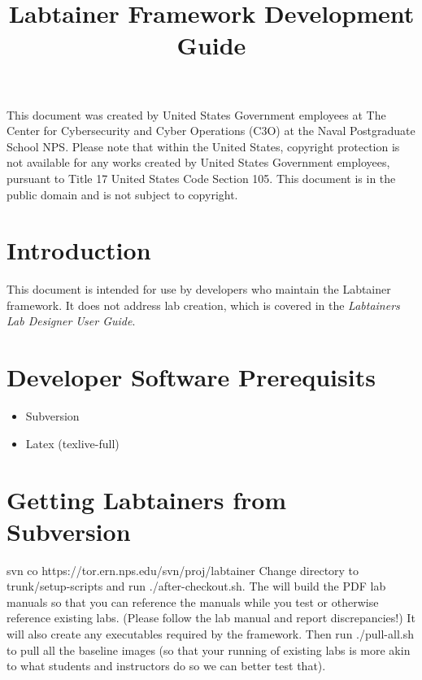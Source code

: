 \documentclass[12pt]{article}
\begin{document}
\begin{titlepage}
\title {Labtainer Framework Development Guide}
\maketitle

\vspace{2.0in}
This document was created by United States Government employees at 
The Center for Cybersecurity and Cyber Operations (C3O) at the Naval Postgraduate School NPS. 
Please note that within the United States, copyright protection is not available for any works created  
by United States Government employees, pursuant to Title 17 United States Code Section 105.   
This document is in the public domain and is not subject to copyright. 
\end{titlepage}
\tableofcontents
\newpage
\section {Introduction}
This document is intended for use by developers who maintain the
Labtainer framework.  It does not address lab creation, which is 
covered in the \textit {Labtainers Lab Designer User Guide}.


\section{Developer Software Prerequisits}
\begin {itemize}
\item Subversion
\item Latex (texlive-full)
\end {itemize}


\section{Getting Labtainers from Subversion}
svn co https://tor.ern.nps.edu/svn/proj/labtainer
Change directory to trunk/setup-scripts and run ./after-checkout.sh. The will build the PDF lab
manuals so that you can reference the manuals while you test or otherwise reference
existing labs.  (Please follow the lab manual and report discrepancies!)
It will also create any executables required by the framework.
Then run ./pull-all.sh to pull all the baseline images (so that your running of 
existing labs is more akin to what students and instructors do so we can better test that).
\end{document}
